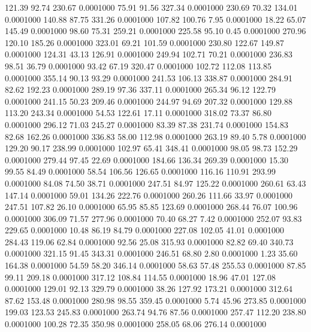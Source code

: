  121.39   92.74  230.67   0.0001000
  75.91   91.56  327.34   0.0001000
 230.69   70.32  134.01   0.0001000
 140.88   87.75  331.26   0.0001000
 107.82  100.76    7.95   0.0001000
  18.22   65.07  145.49   0.0001000
  98.60   75.31  259.21   0.0001000
 225.58   95.10    0.45   0.0001000
 270.96  120.10  185.26   0.0001000
 323.01   69.21  101.59   0.0001000
 230.80  122.67  149.87   0.0001000
 124.31   43.13  126.91   0.0001000
 249.94  102.71   70.21   0.0001000
 236.83   98.51   36.79   0.0001000
  93.42   67.19  320.47   0.0001000
 102.72  112.08  113.85   0.0001000
 355.14   90.13   93.29   0.0001000
 241.53  106.13  338.87   0.0001000
 284.91   82.62  192.23   0.0001000
 289.19   97.36  337.11   0.0001000
 265.34   96.12  122.79   0.0001000
 241.15   50.23  209.46   0.0001000
 244.97   94.69  207.32   0.0001000
 129.88  113.20  243.34   0.0001000
  54.53  122.61   17.11   0.0001000
 318.02   73.37   86.80   0.0001000
 296.12   71.03  245.27   0.0001000
  83.39   87.38  231.74   0.0001000
 154.83   82.68  162.26   0.0001000
 336.83   58.00  112.98   0.0001000
 263.19   89.40    5.78   0.0001000
 129.20   90.17  238.99   0.0001000
 102.97   65.41  348.41   0.0001000
  98.05   98.73  152.29   0.0001000
 279.44   97.45   22.69   0.0001000
 184.66  136.34  269.39   0.0001000
  15.30   99.55   84.49   0.0001000
  58.54  106.56  126.65   0.0001000
 116.16  110.91  293.99   0.0001000
  84.08   74.50   38.71   0.0001000
 247.51   84.97  125.22   0.0001000
 260.61   63.43  147.14   0.0001000
  59.01  134.26  222.76   0.0001000
 260.26  111.66   33.97   0.0001000
 247.51  107.82   26.10   0.0001000
  65.95   85.85  123.69   0.0001000
 268.44   76.07  100.96   0.0001000
 306.09   71.57  277.96   0.0001000
  70.40   68.27    7.42   0.0001000
 252.07   93.83  229.65   0.0001000
  10.48   86.19   84.79   0.0001000
 227.08  102.05   41.01   0.0001000
 284.43  119.06   62.84   0.0001000
  92.56   25.08  315.93   0.0001000
  82.82   69.40  340.73   0.0001000
 321.15   91.45  343.31   0.0001000
 246.51   68.80    2.80   0.0001000
   1.23   35.60  164.38   0.0001000
  54.59   58.20  346.14   0.0001000
  58.63   57.48  255.53   0.0001000
  87.85   99.11  209.18   0.0001000
 317.12  108.84  114.55   0.0001000
  18.96   47.01  127.08   0.0001000
 129.01   92.13  329.79   0.0001000
  38.26  127.92  173.21   0.0001000
 312.64   87.62  153.48   0.0001000
 280.98   98.55  359.45   0.0001000
   5.74   45.96  273.85   0.0001000
 199.03  123.53  245.83   0.0001000
 263.74   94.76   87.56   0.0001000
 257.47  112.20  238.80   0.0001000
 100.28   72.35  350.98   0.0001000
 258.05   68.06  276.14   0.0001000
